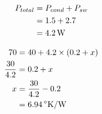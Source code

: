 \subsection{}

\begin{align*}
P_{total} & = P_{cond} + P_{sw} \\
          & = 1.5 + 2.7 \\
          & = \unit[4.2]{W}
\end{align*}

\begin{center}

\end{center}

\begin{align*}
70 & = 40 + 4.2 \times (0.2 + x) \\
\frac{30}{4.2} & = 0.2 + x \\
x & = \frac{30}{4.2} - 0.2 \\
  & = \unit[6.94]{^\circ{}K/W}
\end{align*}